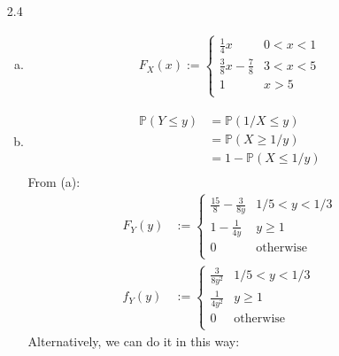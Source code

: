 \documentclass[a4paper,10pt]{article}
\theoremstyle{definition}
\begin{document}
\begin{enumerate}
\begin{enumerate}
\end{enumerate}
\item[2.4] 
\begin{enumerate}[(a)]
\item 
\begin{align*}
F_X(x):= \begin{cases}
\frac{1}{4}x & 0 < x < 1\\
\frac{3}{8}x-\frac{7}{8} & 3 < x < 5\\
1 & x>5\\
\end{cases}
\end{align*}
\item
\begin{align*}
\mathbb{P}(Y \leq y) &= \mathbb{P}(1/X\leq y)\\
&=\mathbb{P}(X\geq 1/y)\\
&=1 - \mathbb{P}(X\leq 1/y)\\
\end{align*}
From (a):
\begin{align*}
F_Y(y)&:= \begin{cases}
\frac{15}{8}-\frac{3}{8y} & 1/5 < y < 1/3\\
1 - \frac{1}{4y} & y \geq 1\\
0 & \text{otherwise}\\
\end{cases}\\
f_Y(y)&:= \begin{cases}
\frac{3}{8y^2} & 1/5 < y < 1/3\\
\frac{1}{4y^2} & y \geq 1\\
0 & \text{otherwise}\\
\end{cases}
\end{align*}
Alternatively, we can do it in this way:


\end{enumerate}
\end{enumerate}
\end{document}
